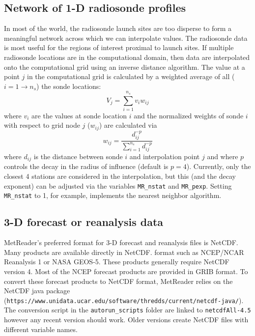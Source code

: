 \documentclass[11pt]{article}   %
\begin{document}
\subsection{Network of 1-D radiosonde profiles}
In most of the world, the radiosonde launch sites are too disperse to form
a meaningful network across which we can interpolate values.  The radiosonde
data is most useful for the regions of interest proximal to launch sites.
If multiple radiosonde locations are in the computational domain, then data
are interpolated onto the computational grid using an inverse distance
algorithm.  The value at a point $j$ in the computational grid is calculated
by a weighted average of all ($i=1\rightarrow n_s$) the sonde locations:
\begin{equation*}
V_j = \sum_{i=1}^{n_s} v_i w_{ij}
\end{equation*}
where $v_i$ are the values at sonde location $i$ and the normalized weights of
sonde $i$ with respect to grid node $j$ ($w_{ij}$) are calculated via
\begin{equation*}
w_{ij} = \frac{d_{ij}^{-p}}{\sum_{i=1}^{n_s} d_{ij}^{-p}}
\end{equation*}
where $d_{ij}$ is the distance between sonde $i$ and interpolation point $j$
and where $p$ controls
the decay in the radius of influence (default is $p=4$).  Currently, only the closest
4 stations are considered in the interpolation, but this (and the decay exponent) can
be adjusted via the variables \texttt{MR\_nstat} and \texttt{MR\_pexp}.  Setting
\texttt{MR\_nstat} to 1, for example, implements the nearest neighbor algorithm.

\subsection{3-D forecast or reanalysis data}
MetReader's preferred format for 3-D forecast and reanalysis files is NetCDF.  Many
products are available directly in NetCDF. format such as NCEP/NCAR Reanalysis 1 or
NASA GEOS-5.  These products generally require NetCDF version 4.  Most of the NCEP
forecast products are provided in GRIB format.  To convert these forecast products
to NetCDF format, MetReader relies on the NetCDF java package\\
(\texttt{https://www.unidata.ucar.edu/software/thredds/current/netcdf-java/}).  The
conversion script in the \texttt{autorun\_scripts} folder are linked to \texttt{netcdfAll-4.5}
however any recent version should work.  Older versions create NetCDF files with
different variable names.
\end{document}
